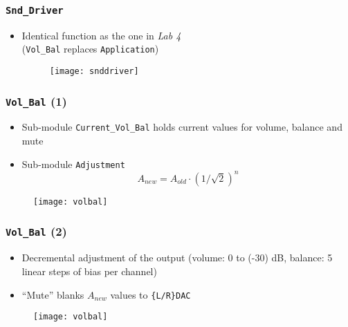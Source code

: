 \begin{frame}
  \frametitle{\texttt{Snd\_Driver}}
    \begin{itemize}
      \item Identical function as the one in \emph{Lab 4}\\ (\texttt{Vol\_Bal} replaces \texttt{Application})
        \begin{figure}
          \centering
          \texttt{[image: snddriver]}
        \end{figure}
    \end{itemize}
\end{frame}

\begin{frame}
  \frametitle{\texttt{Vol\_Bal} (1)}
    \begin{itemize}
      \item Sub-module \texttt{Current\_Vol\_Bal} holds current values for volume, balance and mute
      \item Sub-module \texttt{Adjustment} $$A_{new} = A_{old} \cdot (1/\sqrt{2})^{n}$$
    \end{itemize}
    \begin{figure}
      \centering
      \texttt{[image: volbal]}
    \end{figure}
\end{frame}


\begin{frame}
  \frametitle{\texttt{Vol\_Bal} (2)}
    \begin{itemize}
      \item Decremental adjustment of the output (volume: 0 to (-30) dB, balance: 5 linear steps of bias per channel)
      \item ``Mute'' blanks $A_{new}$ values to \texttt{\{L/R\}DAC}
    \end{itemize}
    \begin{figure}
      \centering
      \texttt{[image: volbal]}
    \end{figure}
\end{frame}



